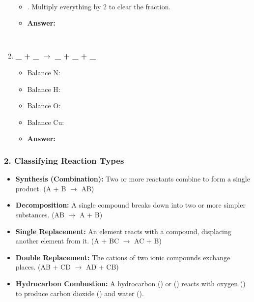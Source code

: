 \documentclass{article}
\begin{document}
\begin{enumerate}[itemsep=5pt]
\begin{itemize}
        \item {}. Multiply everything by 2 to clear the fraction.
        \item \textbf{Answer:} 
    \end{itemize}
    \item \textbf{\_  + \_  $\rightarrow$ \_  + \_  + \_ }
    \begin{itemize}
        \item Balance N: 
        \item Balance H: 
        \item Balance O: 
        \item Balance Cu: 
        \item \textbf{Answer:} 
    \end{itemize}
\end{enumerate}

\bigskip
\subsubsection*{2. Classifying Reaction Types}
\begin{itemize}[itemsep=5pt]
    \item \textbf{Synthesis (Combination):} Two or more reactants combine to form a single product. (A + B $\rightarrow$ AB)
    \item \textbf{Decomposition:} A single compound breaks down into two or more simpler substances. (AB $\rightarrow$ A + B)
    \item \textbf{Single Replacement:} An element reacts with a compound, displacing another element from it. (A + BC $\rightarrow$ AC + B)
    \item \textbf{Double Replacement:} The cations of two ionic compounds exchange places. (AB + CD $\rightarrow$ AD + CB)
    \item \textbf{Hydrocarbon Combustion:} A hydrocarbon () or () reacts with oxygen () to produce carbon dioxide () and water ().
\end{itemize}
\end{document}

